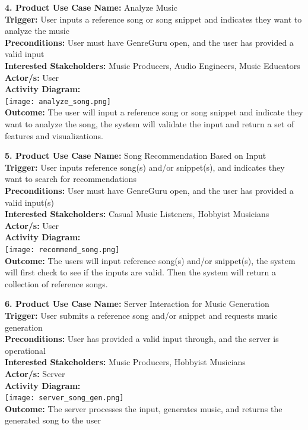 \documentclass[12pt]{article}
\begin{document}
\vspace{1cm}

\noindent \textbf{4. Product Use Case Name:} Analyze Music \\
\textbf{Trigger:} User inputs a reference song or song snippet and indicates they want to analyze the music \\
\textbf{Preconditions:} User must have GenreGuru open, and the user has provided a valid input \\
\textbf{Interested Stakeholders:} Music Producers, Audio Engineers, Music Educators \\
\textbf{Actor/s:} User \\
\textbf{Activity Diagram:} \\
\texttt{[image: analyze\_song.png]} \\
\textbf{Outcome:} The user will input a reference song or song snippet and indicate they want to analyze the song, the system will validate the input and return a set of features and visualizations.

\vspace{1cm}

\noindent \textbf{5. Product Use Case Name:} Song Recommendation Based on Input \\
\textbf{Trigger:} User inputs reference song(s) and/or snippet(s), and indicates they want to search for recommendations \\
\textbf{Preconditions:} User must have GenreGuru open, and the user has provided a valid input(s) \\
\textbf{Interested Stakeholders:} Casual Music Listeners, Hobbyist Musicians \\
\textbf{Actor/s:} User \\
\textbf{Activity Diagram:} \\
\texttt{[image: recommend\_song.png]} \\
\textbf{Outcome:} The users will input reference song(s) and/or snippet(s), the system will first check to see if the inputs are valid. Then the system will return a collection of reference songs.

\vspace{1cm}

\textbf{6. Product Use Case Name:} Server Interaction for Music Generation \\
\textbf{Trigger:} User submits a reference song and/or snippet and requests music generation \\
\textbf{Preconditions:} User has provided a valid input through, and the server is operational \\
\textbf{Interested Stakeholders:} Music Producers, Hobbyist Musicians \\
\textbf{Actor/s:} Server \\
\textbf{Activity Diagram:} \\
\texttt{[image: server\_song\_gen.png]} \\
\textbf{Outcome:} The server processes the input, generates music, and returns the generated song to the user
\end{document}

